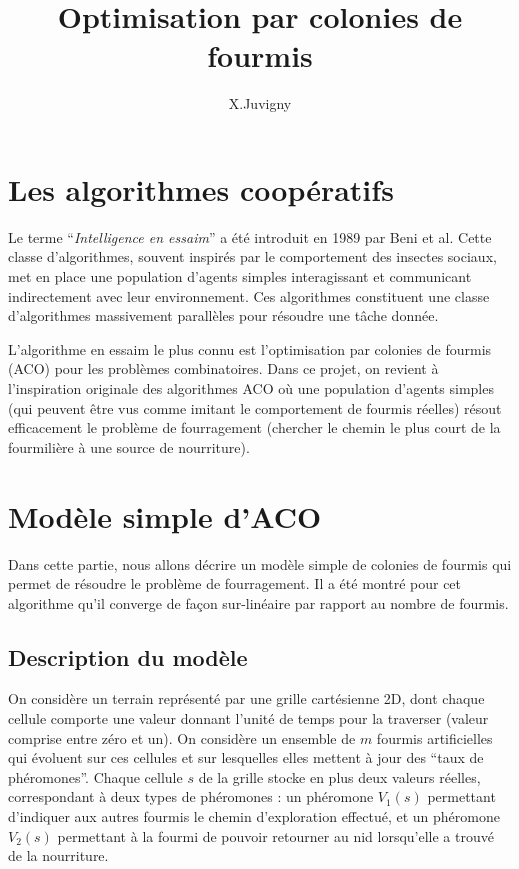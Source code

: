 \documentclass[a4]{article}
\title{Optimisation par colonies de fourmis}
\author{X.Juvigny}
\begin{document}
\maketitle

\section{Les algorithmes coopératifs}

Le terme ``\textsl{Intelligence en essaim}'' a été introduit en 1989 par Beni et al. Cette classe d'algorithmes, souvent inspirés par le comportement des insectes sociaux, met en place une population d'agents simples interagissant et communicant indirectement avec leur
environnement. Ces algorithmes constituent une classe d'algorithmes massivement parallèles pour résoudre une tâche donnée.

L'algorithme en essaim le plus connu est l'optimisation par colonies de fourmis (ACO) pour les problèmes combinatoires. Dans ce projet,
on revient à l'inspiration originale des algorithmes ACO où une population d'agents simples (qui peuvent être vus comme imitant le
comportement de fourmis réelles) résout efficacement le problème de fourragement (chercher le chemin le plus court de la fourmilière
à une source de nourriture).    %

\section{Modèle simple d'ACO}
Dans cette partie, nous allons décrire un modèle simple de colonies de fourmis qui permet de résoudre le problème de fourragement.
Il a été montré pour cet algorithme qu'il converge de façon sur-linéaire par rapport au nombre de fourmis.

\subsection{Description du modèle}

On considère un terrain représenté par une grille cartésienne 2D, dont chaque cellule comporte une valeur donnant l'unité de temps pour
la traverser (valeur comprise entre zéro et un). 
On considère un ensemble de $m$ fourmis artificielles qui évoluent sur ces cellules et sur lesquelles elles mettent à jour des ``taux de
phéromones''. Chaque cellule $s$ de la grille stocke en plus deux valeurs réelles, correspondant à deux types de phéromones : un phéromone
$V_{1}(s)$ permettant d'indiquer aux autres fourmis le chemin d'exploration effectué, et un phéromone $V_{2}(s)$ permettant à la fourmi
de pouvoir retourner au nid lorsqu'elle a trouvé de la nourriture. 
\end{document}
